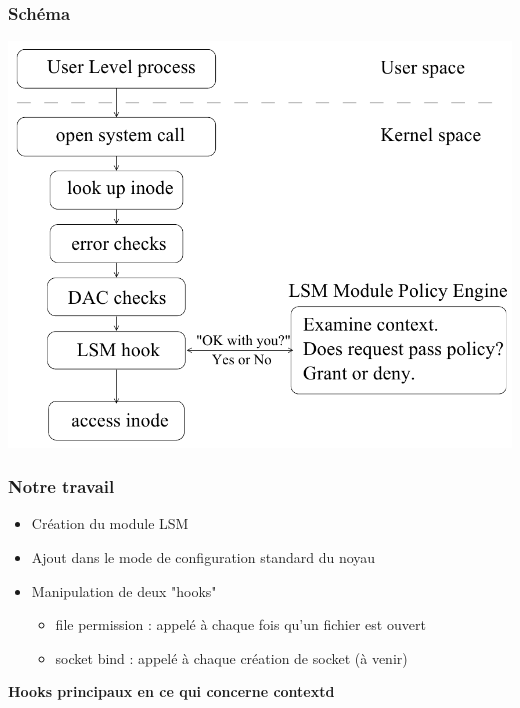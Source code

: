 \documentclass{beamer}
\begin{document}
\begin{frame}
\frametitle{Schéma}
\begin{center}
	\includegraphics[scale=0.30]{lsm1.png}
\end{center}
\end{frame}

\begin{frame}
\frametitle{Notre travail}
\begin{itemize}
	\item Création du module LSM\\
	\item Ajout dans le mode de configuration standard du noyau\\
	\item Manipulation de deux "hooks"\\
	\begin{itemize}
		\item file permission : appelé à chaque fois qu'un fichier est ouvert
		\item socket bind : appelé à chaque création de socket (à venir)
	\end{itemize}
\end{itemize}
\textbf{Hooks principaux en ce qui concerne contextd}\\
\end{frame}
\end{document}

